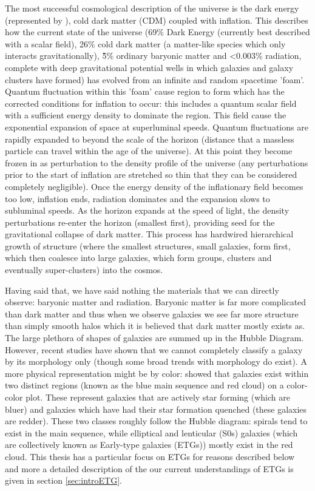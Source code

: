 The most successful cosmological description of the universe is the dark energy (represented by \textLambda), cold dark matter ({\textLambda}CDM) coupled with inflation. This describes how the current state of the universe (69\% Dark Energy (currently best described with a scalar field), 26\% cold dark matter (a matter-like species which only interacts gravitationally), \~5\% ordinary baryonic matter and <0.003\% radiation, complete with deep gravitational potential wells in which galaxies and galaxy clusters have formed) has evolved from an infinite and random spacetime 'foam'. Quantum fluctuation within this 'foam' cause region to form which has the corrected conditions for inflation to occur: this includes a quantum scalar field with a sufficient energy density to dominate the region. This field cause the exponential expansion of space at superluminal speeds. Quantum fluctuations are rapidly expanded to beyond the scale of the horizon (distance that a massless particle can travel within the age of the universe). At this point they become frozen in as perturbation to the density profile of the universe (any perturbations prior to the start of inflation are stretched so thin that they can be considered completely negligible). Once the energy density of the inflationary field becomes too low, inflation ends, radiation dominates and the expansion slows to subluminal speeds. As the horizon expands at the speed of light, the density perturbations re-enter the horizon (smallest first), providing seed for the gravitational collapse of dark matter. This process has hardwired hierarchical growth of structure (where the smallest structures, small galaxies, form first, which then coalesce into large galaxies, which form groups, clusters and eventually super-clusters) into the cosmos. 

Having said that, we have said nothing the materials that we can directly observe: baryonic matter and radiation. Baryonic matter is far more complicated than dark matter and thus when we observe galaxies we see far more structure than simply smooth halos which it is believed that dark matter mostly exists as. The large plethora of shapes of galaxies are summed up in the Hubble Diagram. However, recent studies have shown that we cannot completely classify a galaxy by its morphology only (though some broad trends with morphology do exist). A more physical representation might be by color: \citet{} showed that galaxies exist within two distinct regions (known as the blue main sequence and red cloud) on a color-color plot. These represent galaxies that are actively star forming (which are bluer) and galaxies which have had their star formation quenched (these galaxies are redder). These two classes roughly follow the Hubble diagram: spirals tend to exist in the main sequence, while elliptical and lenticular (S0s) galaxies (which are collectively known as Early-type galaxies (ETGs)) mostly exist in the red cloud. This thesis has a particular focus on ETGs for reasons described below and more a detailed description of the our current understandings of ETGs is given in section \ref{sec:introETG}. 

